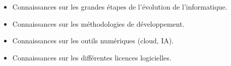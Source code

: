 \begin{itemize}[nosep]
    \item Connaissances sur les grandes étapes de l’évolution de l’informatique.
    \item Connaissances sur les méthodologies de développement.
    \item Connaissances sur les outils numériques (cloud, IA).
    \item Connaissances sur les différentes licences logicielles.
\end{itemize}
